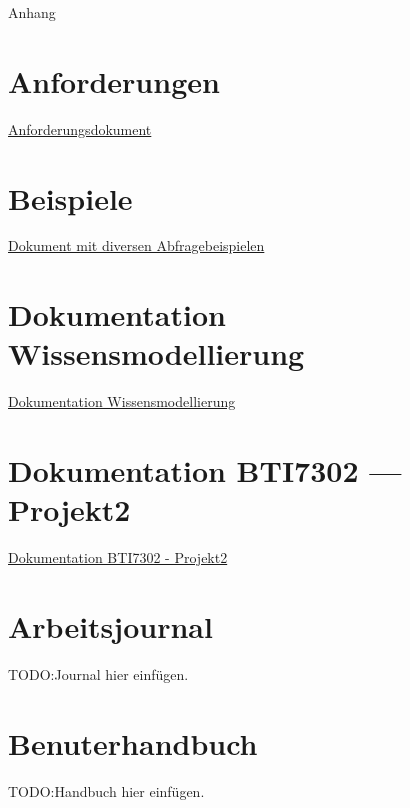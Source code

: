 \begin{titlepage}


    \clearpage
    \vspace*{\fill}
    \begin{center}
        \begin{minipage}{.6\textwidth}
            \fontsize{26pt}{28pt}\selectfont
            Anhang
        \end{minipage}
    \end{center}
    \vfill %
    \clearpage


\end{titlepage}

\newpage 


\appendix

\section*{Anforderungen}
\label{sec:anhang:anforderungen}
\href{anhang/anforderungen.pdf}{Anforderungsdokument}

\section*{Beispiele}
\label{sec:anhang:sparql_beispiele}
\href{anhang/schnipsel.pdf}{Dokument mit diversen Abfragebeispielen}

\section*{Dokumentation Wissensmodellierung}
\label{sec:anhang:tutorial_dokument}
\href{../Tutorial/template.pdf}{Dokumentation Wissensmodellierung}

\section*{Dokumentation BTI7302 --- Projekt2}
\label{sec:anhang:projekt2}
\href{../Extern/EigeneDokumente/DokumentationProjekt2.pdf}{Dokumentation BTI7302 - Projekt2}

\section*{Arbeitsjournal}
\label{sec:anhang:journal}
TODO:\@ Journal hier einfügen.

\section*{Benuterhandbuch}
\label{sec:anhang:handbuch}
TODO:\@ Handbuch hier einfügen.
